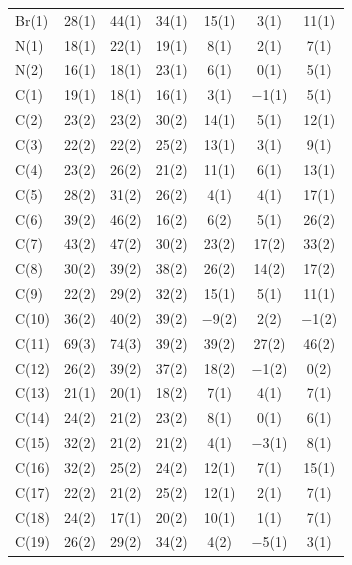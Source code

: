 \begin{center}
\tablelasttail{\bottomrule}
{\footnotesize \singlespacing
\begin{supertabular}{lcccccc}
Br(1)&28(1) &44(1)&34(1) &15(1)&3(1) &11(1)\\
N(1)&18(1) &22(1)&19(1) &8(1)&2(1) &7(1)\\
N(2)&16(1) &18(1)&23(1) &6(1)&0(1) &5(1)\\
C(1)&19(1) &18(1)&16(1) &3(1)&$-$1(1) &5(1)\\
C(2)&23(2) &23(2)&30(2) &14(1)&5(1) &12(1)\\
C(3)&22(2) &22(2)&25(2) &13(1)&3(1) &9(1)\\
C(4)&23(2) &26(2)&21(2) &11(1)&6(1) &13(1)\\
C(5)&28(2) &31(2)&26(2) &4(1)&4(1) &17(1)\\
C(6)&39(2) &46(2)&16(2) &6(2)&5(1) &26(2)\\
C(7)&43(2) &47(2)&30(2) &23(2)&17(2) &33(2)\\
C(8)&30(2) &39(2)&38(2) &26(2)&14(2) &17(2)\\
C(9)&22(2) &29(2)&32(2) &15(1)&5(1) &11(1)\\
C(10)&36(2) &40(2)&39(2) &$-$9(2)&2(2) &$-$1(2)\\
C(11)&69(3) &74(3)&39(2) &39(2)&27(2) &46(2)\\
C(12)&26(2) &39(2)&37(2) &18(2)&$-$1(2) &0(2)\\
C(13)&21(1) &20(1)&18(2) &7(1)&4(1) &7(1)\\
C(14)&24(2) &21(2)&23(2) &8(1)&0(1) &6(1)\\
C(15)&32(2) &21(2)&21(2) &4(1)&$-$3(1) &8(1)\\
C(16)&32(2) &25(2)&24(2) &12(1)&7(1) &15(1)\\
C(17)&22(2) &21(2)&25(2) &12(1)&2(1) &7(1)\\
C(18)&24(2) &17(1)&20(2) &10(1)&1(1) &7(1)\\
C(19)&26(2) &29(2)&34(2) &4(2)&$-$5(1) &3(1)\\

\end{supertabular}}
\end{center}
